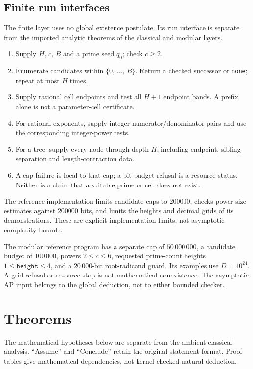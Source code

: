 \documentclass[11pt,reqno]{amsart}
\theoremstyle{blueplain}
\providecommand{\comma}{\allowbreak,\,}
\numberwithin{equation}{section}
\def\hyperlink#1#2{#2}}
\begin{document}
\subsection{Finite run interfaces}
The finite layer uses no global existence postulate. Its run interface is
separate from the imported analytic theorems of the classical and modular layers.
\begin{enumerate}
\item Supply \(H\comma c\comma B\) and a prime seed \(q_0\); check \(c\ge2\).
\item Enumerate candidates within \(\{0\comma \ldots\comma B\}\). Return a checked
successor or \texttt{none}; repeat at most \(H\) times.
\item Supply rational cell endpoints and test all \(H+1\) endpoint bands.
A prefix alone is not a parameter-cell certificate.
\item For rational exponents, supply integer numerator/denominator pairs
and use the corresponding integer-power tests.
\item For a tree, supply every node through depth \(H\), including endpoint,
sibling-separation and length-contraction data.
\item A cap failure is local to that cap; a bit-budget refusal is a resource
status. Neither is a claim that a suitable prime or cell does not exist.
\end{enumerate}
The reference implementation limits candidate caps to \(200000\), checks
power-size estimates against \(200000\) bits, and limits the heights and
decimal grids of its demonstrations. These are explicit implementation
limits, not asymptotic complexity bounds.


The modular reference program has a separate cap of \(50\,000\,000\),
a candidate budget of \(100\,000\), powers \(2\le c\le6\), requested
prime-count heights \(1\le\texttt{height}\le4\), and a \(20\,000\)-bit
root-radicand guard. Its examples use \(D=10^{24}\). A grid refusal or
resource stop is not mathematical nonexistence. The asymptotic \hyperlink{term:AP}{AP} input
belongs to the global deduction, not to either bounded checker.

\section{Theorems}\label{sec:theorems}
The mathematical hypotheses below are separate from the ambient classical
analysis. ``Assume'' and ``Conclude'' retain the original statement format.
Proof tables give mathematical dependencies, not kernel-checked natural deduction.
\end{document}
